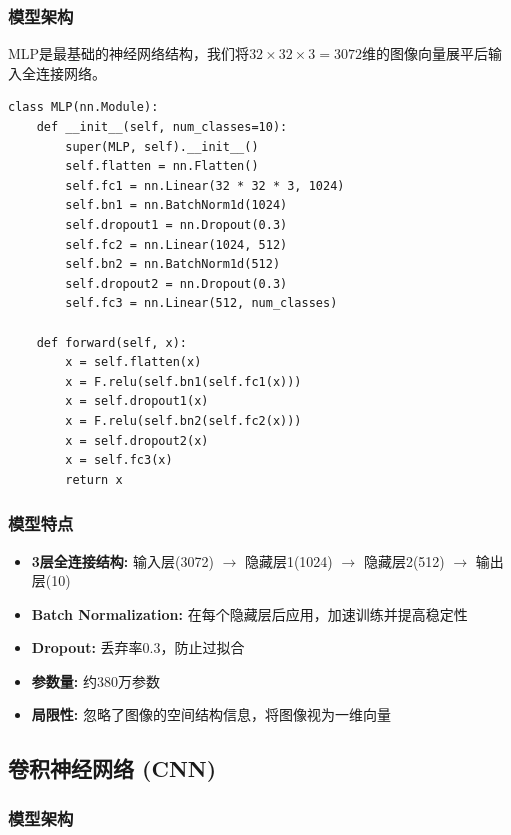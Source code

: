\documentclass[12pt,a4paper]{article}
\begin{document}
\subsubsection{模型架构}

MLP是最基础的神经网络结构，我们将$32 \times 32 \times 3 = 3072$维的图像向量展平后输入全连接网络。

\begin{lstlisting}[caption={MLP模型定义},label={lst:mlp}]
class MLP(nn.Module):
    def __init__(self, num_classes=10):
        super(MLP, self).__init__()
        self.flatten = nn.Flatten()
        self.fc1 = nn.Linear(32 * 32 * 3, 1024)
        self.bn1 = nn.BatchNorm1d(1024)
        self.dropout1 = nn.Dropout(0.3)
        self.fc2 = nn.Linear(1024, 512)
        self.bn2 = nn.BatchNorm1d(512)
        self.dropout2 = nn.Dropout(0.3)
        self.fc3 = nn.Linear(512, num_classes)
        
    def forward(self, x):
        x = self.flatten(x)
        x = F.relu(self.bn1(self.fc1(x)))
        x = self.dropout1(x)
        x = F.relu(self.bn2(self.fc2(x)))
        x = self.dropout2(x)
        x = self.fc3(x)
        return x
\end{lstlisting}

\subsubsection{模型特点}

\begin{itemize}[leftmargin=2em]
    \item \textbf{3层全连接结构:} 输入层(3072) $\rightarrow$ 隐藏层1(1024) $\rightarrow$ 隐藏层2(512) $\rightarrow$ 输出层(10)
    \item \textbf{Batch Normalization:} 在每个隐藏层后应用，加速训练并提高稳定性
    \item \textbf{Dropout:} 丢弃率0.3，防止过拟合
    \item \textbf{参数量:} 约380万参数
    \item \textbf{局限性:} 忽略了图像的空间结构信息，将图像视为一维向量
\end{itemize}

\subsection{卷积神经网络 (CNN)}

\subsubsection{模型架构}
\end{document}

